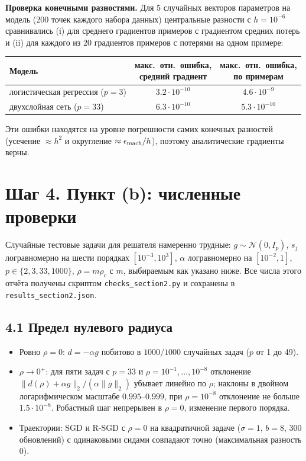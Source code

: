 \documentclass[11pt,a4paper]{article}
\newcommand{\norm}[1]{\lVert #1\rVert_2}
\begin{document}
\textbf{Проверка конечными разностями.} Для 5 случайных векторов параметров на модель
(200 точек каждого набора данных) центральные разности с $h=10^{-6}$ сравнивались (i)
для среднего градиентов примеров с градиентом средних потерь и (ii) для каждого из 20
градиентов примеров с потерями на одном примере:

\begin{center}
\begin{tabular}{@{}lcc@{}}
\toprule
Модель & \shortstack{макс.\ отн.\ ошибка,\\ средний градиент} & \shortstack{макс.\ отн.\ ошибка,\\ по примерам} \\
\midrule
логистическая регрессия ($p=3$) & $3.2\cdot10^{-10}$ & $4.6\cdot10^{-9}$ \\
двухслойная сеть ($p=33$) & $6.3\cdot10^{-10}$ & $5.3\cdot10^{-10}$ \\
\bottomrule
\end{tabular}
\end{center}
Эти ошибки находятся на уровне погрешности самих конечных разностей (усечение
$\approx h^2$ и округление $\approx\epsilon_{\rm mach}/h$), поэтому аналитические
градиенты верны.

\section*{Шаг 4. Пункт (b): численные проверки}

Случайные тестовые задачи для решателя намеренно трудные: $g\sim\mathcal N(0,I_p)$,
$s_j$ логравномерно на шести порядках $[10^{-3},10^3]$, $\alpha$ логравномерно на
$[10^{-2},1]$, $p\in\{2,3,33,1000\}$, $\rho=m\rho_c$ с $m$, выбираемым как указано
ниже. Все числа этого отчёта получены скриптом \texttt{checks\_section2.py} и
сохранены в \texttt{results\_section2.json}.

\subsection*{4.1 Предел нулевого радиуса}
\begin{itemize}
\item Ровно $\rho=0$: $d=-\alpha g$ побитово в $1000/1000$ случайных задач ($p$ от 1
до 49).
\item $\rho\to0^+$: для пяти задач с $p=33$ и $\rho=10^{-1},\dots,10^{-8}$ отклонение
$\norm{d(\rho)+\alpha g}/(\alpha\norm g)$ убывает линейно по $\rho$; наклоны в
двойном логарифмическом масштабе $0.995$--$0.999$, при $\rho=10^{-8}$ отклонение не
больше $1.5\cdot10^{-8}$. Робастный шаг непрерывен в $\rho=0$, изменение первого
порядка.
\item Траектории: SGD и R-SGD с $\rho=0$ на квадратичной задаче ($\sigma=1$, $b=8$,
300 обновлений) с одинаковыми сидами совпадают точно (максимальная разность 0).
\end{itemize}
\end{document}
